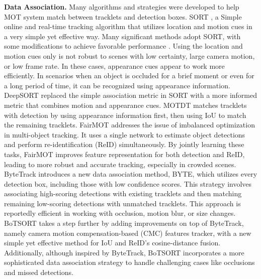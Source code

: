 \textbf{Data Association.} Many algorithms and strategies were developed to help MOT system match between tracklets and detection boxes. SORT \cite{bewleySimpleOnlineRealtime2016}, a Simple online and real-time tracking algorithm that utilizes location and motion cues in a very simple yet effective way. Many significant methods adopt SORT, with some modifications to achieve favorable performance \cite{zhangByteTrackMultiObjectTracking2022, zhangFairMOT2021, mingyangHybridSORTWeakCues2023, caoObservationcentricSortRethinking2023, wangJDE2020, yiUCMCTrackMultiObjectTracking2024, wojkeSimpleOnlineRealtime2017}. Using the location and motion cues only is not robust to scenes with low certainty, large camera motion, or low frame rate. In these cases, appearance cues appear to work more efficiently. In scenarios when an object is occluded for a brief moment or even for a long period of time, it can be recognized using appearance information. DeepSORT \cite{wojkeSimpleOnlineRealtime2017} replaced the simple association metric in SORT with a more informed metric that combines motion and appearance cues. MOTDT \cite{chenRealtimeMultiplePeople2018} matches tracklets with detection by using appearance information first, then using IoU to match the remaining tracklets. FairMOT \cite{zhangFairMOT2021} addresses the issue of imbalanced optimization in multi-object tracking. It uses a single network to estimate object detections and perform re-identification (ReID) simultaneously. By jointly learning these tasks, FairMOT improves feature representation for both detection and ReID, leading to more robust and accurate tracking, especially in crowded scenes. ByteTrack \cite{zhangByteTrackMultiObjectTracking2022} introduces a new data association method, BYTE, which utilizes every detection box, including those with low confidence scores. This strategy involves associating high-scoring detections with existing tracklets and then matching remaining low-scoring detections with unmatched tracklets. This approach is reportedly efficient in working with occlusion, motion blur, or size changes. BoTSORT \cite{aharonBoTSORTRobustAssociations2022} takes a step further by adding improvements on top of ByteTrack, namely camera motion compensation-based (CMC) features tracker, with a new simple yet effective method for IoU and ReID’s cosine-distance fusion. Additionally, although inspired by ByteTrack, BoTSORT incorporates a more sophisticated data association strategy to handle challenging cases like occlusions and missed detections. 

